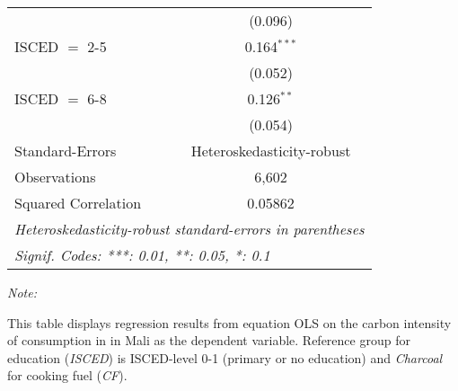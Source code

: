 \begin{table}[htbp!]
\begin{adjustbox}{width = 1\textwidth, max height = 0.95\textheight, center}
\begin{threeparttable}[b]
\begin{tabular}{lc}
                                & (0.096)\\   
            ISCED $=$ 2-5       & 0.164$^{***}$\\   
                                & (0.052)\\   
            ISCED $=$ 6-8       & 0.126$^{**}$\\   
                                & (0.054)\\   
            \midrule 
            Standard-Errors     & Heteroskedasticity-robust \\   
            Observations        & 6,602\\  
            Squared Correlation & 0.05862\\  
            \midrule \midrule
            \multicolumn{2}{l}{\emph{Heteroskedasticity-robust standard-errors in parentheses}}\\
            \multicolumn{2}{l}{\emph{Signif. Codes: ***: 0.01, **: 0.05, *: 0.1}}\\
         \end{tabular}
         
         \begin{tablenotes}\item \medskip \textit{Note:}
            \item This table displays regression results from equation OLS on the carbon intensity of consumption in  in Mali as the dependent variable. Reference group for education (\textit{ISCED}) is ISCED-level 0-1 (primary or no education) and \textit{Charcoal} for cooking fuel (\textit{CF}).
         \end{tablenotes}
      \end{threeparttable}
   \end{adjustbox}
\end{table}


